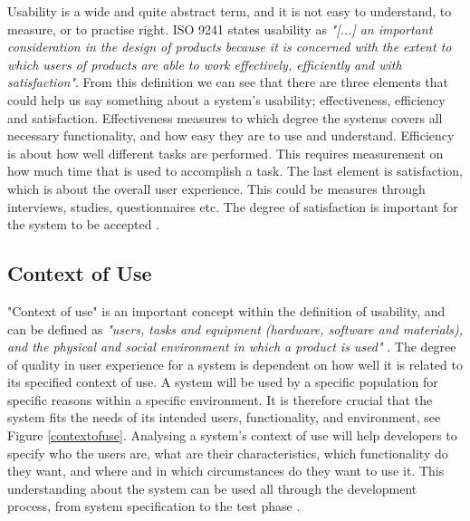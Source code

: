 Usability is a wide and quite abstract term, and it is not easy to understand, to measure, or to practise right. ISO 9241 states usability as \emph{"[...] an important consideration in the design of products because it is concerned with the extent to which users of products are able to work effectively, efficiently and with satisfaction"}\cite{usabilitydef}. From this definition we can see that there are three elements that could help us say something about a system's usability; effectiveness, efficiency and satisfaction. Effectiveness measures to which degree the systems covers all necessary functionality, and how easy they are to use and understand. Efficiency is about how well different tasks are performed. This requires measurement on how much time that is used to accomplish a task. The last element is satisfaction, which is about the overall user experience. This could be measures through interviews, studies, questionnaires etc. The degree of satisfaction is important for the system to be accepted \cite{mmi}. 

\subsection{Context of Use}
"Context of use" is an important concept within the definition of usability, and can be defined as \emph{"users, tasks and equipment (hardware, software and materials), and the physical and social environment in which a product is used"} \cite{maguire2001context}. The degree of quality in user experience for a system is dependent on how well it is related to its specified context of use. A system will be used by a specific population for specific reasons within a specific environment. It is therefore crucial that the system fits the needs of its intended users, functionality, and environment, see Figure \ref{contextofuse}. Analysing a system's context of use will help developers to specify who the users are, what are their characteristics, which functionality do they want, and where and in which circumstances do they want to use it. This understanding about the system can be used all through the development process, from system specification to the test phase \cite{maguire2001context}.


